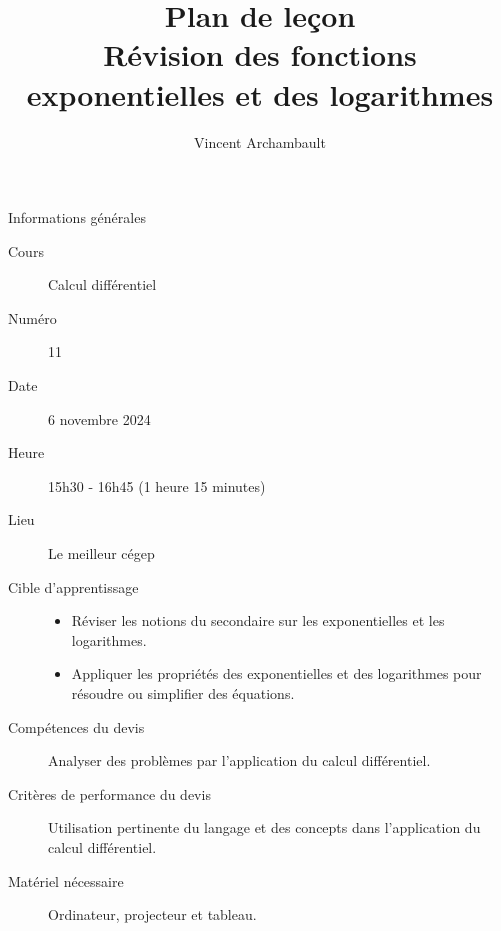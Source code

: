 \documentclass[12pt]{article}
\title{\sffamily Plan de leçon\\ Révision des fonctions exponentielles et des logarithmes}
\author{\sffamily Vincent Archambault}
\date{}
\newcommand\mysection[1]{\section{\sffamily #1}}
\begin{document}
\maketitle

\mysection*{Informations générales}
\begin{description}
\item[\faBook{} Cours] Calcul différentiel
\item[{\faHashtag} Numéro] 11
\item[{\faCalendar*[regular]} Date] 6 novembre 2024
\item[{\faClock[regular]} Heure] 15h30 - 16h45 (1 heure 15 minutes)
\item[\faLandmark{} Lieu] Le meilleur cégep
\item[\faBullseye{} Cible d'apprentissage]
\mbox{}\newline\leavevmode\vspace{-3ex}\begin{itemize}
    \item Réviser les notions du secondaire sur les exponentielles et les logarithmes.
    \item Appliquer les propriétés des exponentielles et des logarithmes pour résoudre ou simplifier des équations.
\end{itemize}
\item[\faToolbox{} Compétences du devis] Analyser des problèmes par l’application du calcul différentiel.
\item[\faUserCheck{} Critères de performance du devis] Utilisation pertinente du langage et des concepts dans l’application du calcul différentiel.
\item[\faTv{} Matériel nécessaire] Ordinateur, projecteur et tableau.
\end{description}
\end{document}
